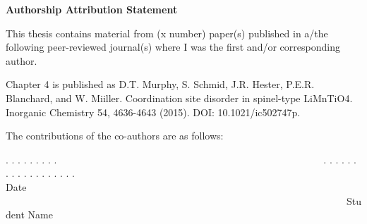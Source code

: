 \thispagestyle{empty}



\begin{center}
	\textbf{\large{Authorship Attribution Statement}}
\end{center}

This thesis contains material from (x number) paper(s) published in a/the following peer-reviewed journal(s) where I was the first and/or corresponding author.

Chapter 4 is published as D.T. Murphy, S. Schmid, J.R. Hester, P.E.R. Blanchard, and W. Miiller.  Coordination site disorder in spinel-type LiMnTiO4.  Inorganic Chemistry 54, 4636-4643 (2015). DOI: 10.1021/ic502747p.

The contributions of the co-authors are as follows:


\vfill

\begin{center}
	. . . . . . . . .~~~~~~~~~~~~~~~~~~~~~~~~~~~~~~~~~~~~~~~~~~~~~~~~~~~~~~. . . . . . . . . . . . . . . . . .\\
	Date ~~~~~~~~~~~~~~~~~~~~~~~~~~~~~~~~~~~~~~~~~~~~~~~~~~~~~~~~~~~~~~~~~~~~~Student Name
\end{center}

\vspace{15em}

\cleardoublepage

